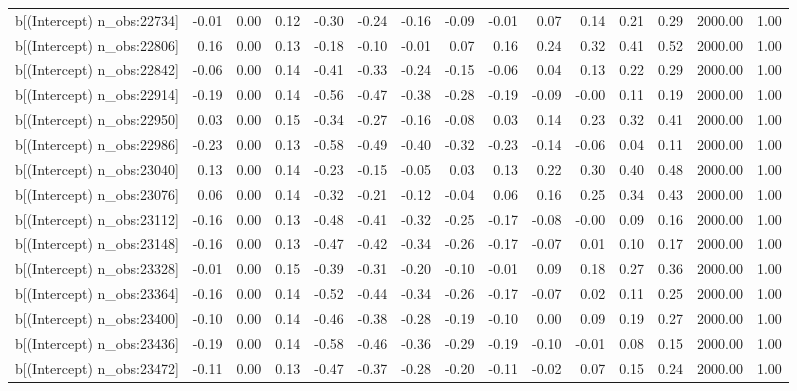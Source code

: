 \begin{table}[ht]
\begin{tabular}{rrrrrrrrrrrrrrr}
  b[(Intercept) n\_obs:22734] & -0.01 & 0.00 & 0.12 & -0.30 & -0.24 & -0.16 & -0.09 & -0.01 & 0.07 & 0.14 & 0.21 & 0.29 & 2000.00 & 1.00 \\ 
  b[(Intercept) n\_obs:22806] & 0.16 & 0.00 & 0.13 & -0.18 & -0.10 & -0.01 & 0.07 & 0.16 & 0.24 & 0.32 & 0.41 & 0.52 & 2000.00 & 1.00 \\ 
  b[(Intercept) n\_obs:22842] & -0.06 & 0.00 & 0.14 & -0.41 & -0.33 & -0.24 & -0.15 & -0.06 & 0.04 & 0.13 & 0.22 & 0.29 & 2000.00 & 1.00 \\ 
  b[(Intercept) n\_obs:22914] & -0.19 & 0.00 & 0.14 & -0.56 & -0.47 & -0.38 & -0.28 & -0.19 & -0.09 & -0.00 & 0.11 & 0.19 & 2000.00 & 1.00 \\ 
  b[(Intercept) n\_obs:22950] & 0.03 & 0.00 & 0.15 & -0.34 & -0.27 & -0.16 & -0.08 & 0.03 & 0.14 & 0.23 & 0.32 & 0.41 & 2000.00 & 1.00 \\ 
  b[(Intercept) n\_obs:22986] & -0.23 & 0.00 & 0.13 & -0.58 & -0.49 & -0.40 & -0.32 & -0.23 & -0.14 & -0.06 & 0.04 & 0.11 & 2000.00 & 1.00 \\ 
  b[(Intercept) n\_obs:23040] & 0.13 & 0.00 & 0.14 & -0.23 & -0.15 & -0.05 & 0.03 & 0.13 & 0.22 & 0.30 & 0.40 & 0.48 & 2000.00 & 1.00 \\ 
  b[(Intercept) n\_obs:23076] & 0.06 & 0.00 & 0.14 & -0.32 & -0.21 & -0.12 & -0.04 & 0.06 & 0.16 & 0.25 & 0.34 & 0.43 & 2000.00 & 1.00 \\ 
  b[(Intercept) n\_obs:23112] & -0.16 & 0.00 & 0.13 & -0.48 & -0.41 & -0.32 & -0.25 & -0.17 & -0.08 & -0.00 & 0.09 & 0.16 & 2000.00 & 1.00 \\ 
  b[(Intercept) n\_obs:23148] & -0.16 & 0.00 & 0.13 & -0.47 & -0.42 & -0.34 & -0.26 & -0.17 & -0.07 & 0.01 & 0.10 & 0.17 & 2000.00 & 1.00 \\ 
  b[(Intercept) n\_obs:23328] & -0.01 & 0.00 & 0.15 & -0.39 & -0.31 & -0.20 & -0.10 & -0.01 & 0.09 & 0.18 & 0.27 & 0.36 & 2000.00 & 1.00 \\ 
  b[(Intercept) n\_obs:23364] & -0.16 & 0.00 & 0.14 & -0.52 & -0.44 & -0.34 & -0.26 & -0.17 & -0.07 & 0.02 & 0.11 & 0.25 & 2000.00 & 1.00 \\ 
  b[(Intercept) n\_obs:23400] & -0.10 & 0.00 & 0.14 & -0.46 & -0.38 & -0.28 & -0.19 & -0.10 & 0.00 & 0.09 & 0.19 & 0.27 & 2000.00 & 1.00 \\ 
  b[(Intercept) n\_obs:23436] & -0.19 & 0.00 & 0.14 & -0.58 & -0.46 & -0.36 & -0.29 & -0.19 & -0.10 & -0.01 & 0.08 & 0.15 & 2000.00 & 1.00 \\ 
  b[(Intercept) n\_obs:23472] & -0.11 & 0.00 & 0.13 & -0.47 & -0.37 & -0.28 & -0.20 & -0.11 & -0.02 & 0.07 & 0.15 & 0.24 & 2000.00 & 1.00 \\ 

\end{tabular}
\end{table}
